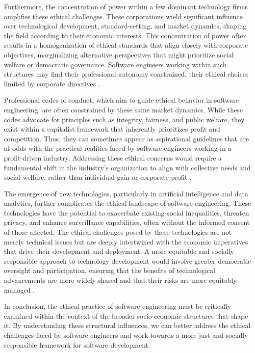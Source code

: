 \begin{refsection}
Furthermore, the concentration of power within a few dominant technology firms amplifies these ethical challenges. These corporations wield significant influence over technological development, standard-setting, and market dynamics, shaping the field according to their economic interests. This concentration of power often results in a homogenization of ethical standards that align closely with corporate objectives, marginalizing alternative perspectives that might prioritize social welfare or democratic governance. Software engineers working within such structures may find their professional autonomy constrained, their ethical choices limited by corporate directives \cite[pp.~60-63]{schiller2000digital}.

Professional codes of conduct, which aim to guide ethical behavior in software engineering, are often constrained by these same market dynamics. While these codes advocate for principles such as integrity, fairness, and public welfare, they exist within a capitalist framework that inherently prioritizes profit and competition. Thus, they can sometimes appear as aspirational guidelines that are at odds with the practical realities faced by software engineers working in a profit-driven industry. Addressing these ethical concerns would require a fundamental shift in the industry's organization to align with collective needs and social welfare, rather than individual gain or corporate profit \cite[pp.~78-81]{eagleton2021why}.

The emergence of new technologies, particularly in artificial intelligence and data analytics, further complicates the ethical landscape of software engineering. These technologies have the potential to exacerbate existing social inequalities, threaten privacy, and enhance surveillance capabilities, often without the informed consent of those affected. The ethical challenges posed by these technologies are not merely technical issues but are deeply intertwined with the economic imperatives that drive their development and deployment. A more equitable and socially responsible approach to technology development would involve greater democratic oversight and participation, ensuring that the benefits of technological advancements are more widely shared and that their risks are more equitably managed \cite[pp.~100-102]{zuboff2020age}.

In conclusion, the ethical practice of software engineering must be critically examined within the context of the broader socio-economic structures that shape it. By understanding these structural influences, we can better address the ethical challenges faced by software engineers and work towards a more just and socially responsible framework for software development.


\end{refsection}
